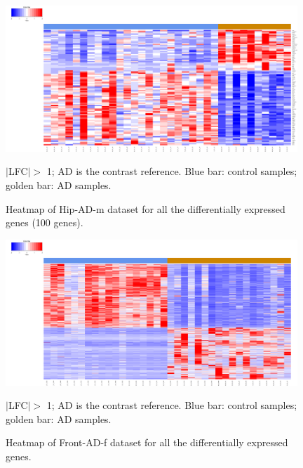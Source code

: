 \begin{figure}[!ht]
    \centerline{\includegraphics[width = 11cm]{Figures/DE heatmap/CTLvsAD-HIP-m_100.png}}
\caption{Heatmap of Hip-AD-m dataset for all the differentially expressed genes (100 genes).}
\label{DE-hip-ad-m}
\footnotesize $|$LFC$| >$ 1; AD is the contrast reference. Blue bar: control samples; golden bar: AD samples.
\end{figure}


\begin{figure}[!ht]
    \centerline{\includegraphics[width = 11cm]{Figures/DE heatmap/CTLvsAD-Front-f_all.png}}
\caption{Heatmap of Front-AD-f dataset for all the differentially expressed genes.}
\label{DE-front-ad-f}
\footnotesize $|$LFC$| >$ 1; AD is the contrast reference. Blue bar: control samples; golden bar: AD samples.
\end{figure}


